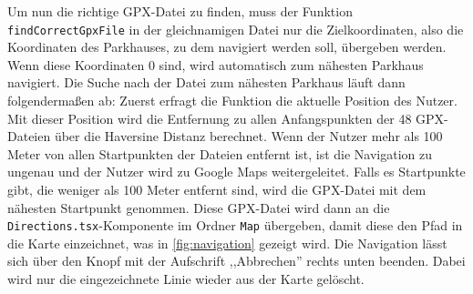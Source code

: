 Um nun die richtige GPX-Datei zu finden, muss der Funktion \verb|findCorrectGpxFile| in der gleichnamigen Datei nur die Zielkoordinaten, also die Koordinaten des Parkhauses, zu dem navigiert werden soll, übergeben werden. Wenn diese Koordinaten 0 sind, wird automatisch zum nähesten Parkhaus navigiert. Die Suche nach der Datei zum nähesten Parkhaus läuft dann folgendermaßen ab: Zuerst erfragt die Funktion die aktuelle Position des Nutzer. Mit dieser Position wird die Entfernung zu allen Anfangspunkten der 48 GPX-Dateien über die Haversine Distanz berechnet. Wenn der Nutzer mehr als 100 Meter von allen Startpunkten der Dateien entfernt ist, ist die Navigation zu ungenau und der Nutzer wird zu Google Maps weitergeleitet. Falls es Startpunkte gibt, die weniger als 100 Meter entfernt sind, wird die GPX-Datei mit dem nähesten Startpunkt genommen. Diese GPX-Datei wird dann an die \verb|Directions.tsx|-Komponente im Ordner \verb|Map| übergeben, damit diese den Pfad in die Karte einzeichnet, was in \autoref{fig:navigation} gezeigt wird. Die Navigation lässt sich über den Knopf mit der Aufschrift ,,Abbrechen'' rechts unten beenden. Dabei wird nur die eingezeichnete Linie wieder aus der Karte gelöscht.

